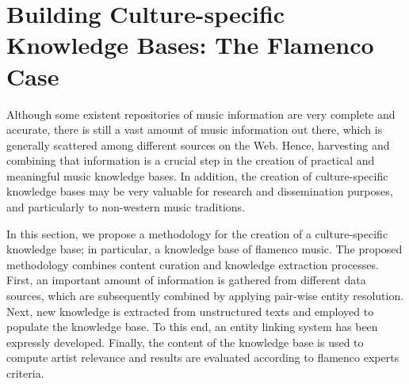 

\section{Building Culture-specific Knowledge Bases: The Flamenco Case}


Although some existent repositories of music information are very complete and accurate, there is still a vast amount of music information out there, which is generally scattered among different sources on the Web. Hence, harvesting and combining that information is a crucial step in the creation of practical and meaningful music knowledge bases. In addition, the creation of culture-specific knowledge bases may be very valuable for research and dissemination purposes, and particularly to non-western music traditions. 

In this section, we propose a methodology for the creation of a culture-specific knowledge base; in particular, a knowledge base of flamenco music. The proposed methodology combines content curation and knowledge extraction processes. First, an important amount of information is gathered from different data sources, which are subsequently combined by applying pair-wise entity resolution. Next, new knowledge is extracted from unstructured texts and employed to populate the knowledge base. To this end, an entity linking system has been expressly developed. Finally, the content of the knowledge base is used to compute artist relevance and results are evaluated according to flamenco experts criteria. %



